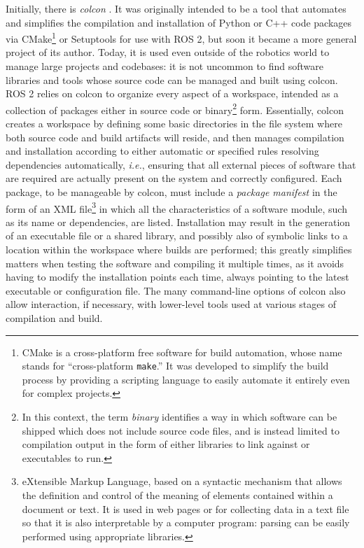 Initially, there is \emph{colcon} \cite{thomas_colcon_nodate}. It was originally intended to be a tool that automates and simplifies the compilation and installation of Python or C++ code packages via CMake\footnote{CMake \cite{kitware_cmake_nodate} is a cross-platform free software for build automation, whose name stands for ``cross-platform \texttt{make}.'' It was developed to simplify the build process by providing a scripting language to easily automate it entirely even for complex projects.} \cite{kitware_cmake_nodate} or Setuptools \cite{eby_setuptools_nodate} for use with ROS 2, but soon it became a more general project of its author. Today, it is used even outside of the robotics world to manage large projects and codebases: it is not uncommon to find software libraries and tools whose source code can be managed and built using colcon. ROS 2 relies on colcon to organize every aspect of a workspace, intended as a collection of packages either in source code or binary\footnote{In this context, the term \emph{binary} identifies a way in which software can be shipped which does not include source code files, and is instead limited to compilation output in the form of either libraries to link against or executables to run.} form. Essentially, colcon creates a workspace by defining some basic directories in the file system where both source code and build artifacts will reside, and then manages compilation and installation according to either automatic or specified rules resolving dependencies automatically, \emph{i.e.}, ensuring that all external pieces of software that are required are actually present on the system and correctly configured. Each package, to be manageable by colcon, must include a \emph{package manifest} in the form of an XML file\footnote{eXtensible Markup Language, based on a syntactic mechanism that allows the definition and control of the meaning of elements contained within a document or text. It is used in web pages or for collecting data in a text file so that it is also interpretable by a computer program: parsing can be easily performed using appropriate libraries.} in which all the characteristics of a software module, such as its name or dependencies, are listed. Installation may result in the generation of an executable file or a shared library, and possibly also of symbolic links to a location within the workspace where builds are performed; this greatly simplifies matters when testing the software and compiling it multiple times, as it avoids having to modify the installation points each time, always pointing to the latest executable or configuration file. The many command-line options of colcon also allow interaction, if necessary, with lower-level tools used at various stages of compilation and build.

